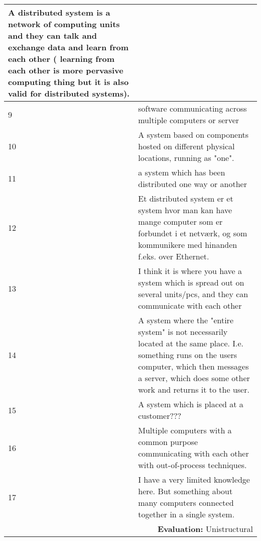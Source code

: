 \begin{longtable}{|p{0.3cm}|p{14.7cm}|}
\noindent A distributed system is a network of computing units and they can talk and exchange data and learn from each other ( learning from each other is more pervasive computing thing but it is also valid for distributed systems).  \\ \hline 
	
9 & software communicating across multiple computers or server \\ \hline 

10 & A system based on components hosted on different physical locations, running as "one". \\ \hline 

11 & a system which has been distributed one way or another \\ \hline 

12 & Et distributed system er et system hvor man kan have mange computer som er forbundet i et netværk, og som kommunikere med hinanden f.eks. over Ethernet. \\ \hline 

13 & I think it is where you have a system which is spread out on several units/pcs, and they can communicate with each other \\ \hline  

14 & A system where the "entire system" is not necessarily located at the same place. I.e. something runs on the users computer, which then messages a server, which does some other work and returns it to the user. \\ \hline 

15 & A system which is placed at a customer??? \\ \hline 

16 & Multiple computers with a common purpose communicating with each other with out-of-process techniques. \\ \hline 

17 & I have a very limited knowledge here. But something about many computers connected together in a single system. \\ \hline 

\multicolumn{2}{r}{\textbf{Evaluation:} Unistructural} \\ 

\end{longtable}
\normalsize

